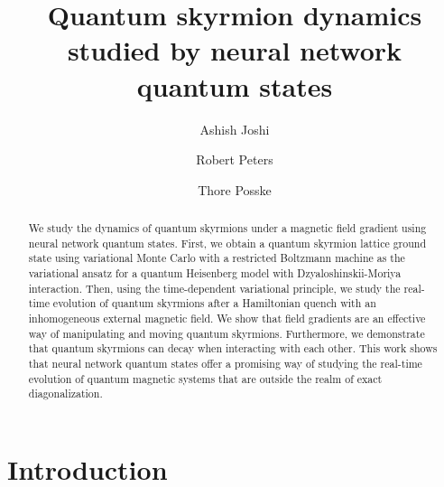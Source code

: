 \documentclass[aps,prb,twocolumn,superscriptaddress,a4paper,longbibliography]{revtex4-2}
\begin{document}
\title{Quantum skyrmion dynamics studied by neural network quantum states}

\author{Ashish Joshi}
\author{Robert Peters}
\author{Thore Posske}
\begin{abstract}

We study the dynamics of quantum skyrmions under a magnetic field gradient using neural network quantum states. First, we obtain a quantum skyrmion lattice ground state using variational Monte Carlo with a restricted Boltzmann machine as the variational ansatz for a quantum Heisenberg model with Dzyaloshinskii-Moriya interaction. Then, using the time-dependent variational principle, we study the real-time evolution of quantum skyrmions after a Hamiltonian quench with an inhomogeneous external magnetic field. We show that field gradients are an effective way of manipulating and moving quantum skyrmions. Furthermore, we demonstrate that quantum skyrmions can decay when interacting with each other. This work shows that neural network quantum states offer a promising way of studying the real-time evolution of quantum magnetic systems that are outside the realm of exact diagonalization.

\end{abstract}

\maketitle

\section{Introduction}
\label{introduction}
\end{document}
